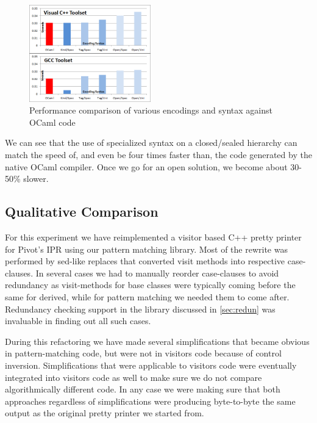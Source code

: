 \begin{figure}[htbp]
  \centering
    \includegraphics[width=0.47\textwidth]{OCamlComparison.png}
  \caption{Performance comparison of various encodings and syntax against OCaml code}
  \label{fig:OCamlComparison}
\end{figure}

We can see that the use of specialized syntax on a closed/sealed hierarchy can 
match the speed of, and even be four times faster than, the code generated by 
the native OCaml compiler. Once we go for an open solution, we become about 
30-50\% slower. 

\subsection{Qualitative Comparison}
\label{sec:qualcmp}

For this experiment we have reimplemented a visitor based C++ pretty printer for 
Pivot's IPR using our pattern matching library. Most of the rewrite was 
performed by sed-like replaces that converted visit methods into respective 
case-clauses. In several cases we had to manually reorder case-clauses to avoid 
redundancy as visit-methods for base classes were typically coming before the 
same for derived, while for pattern matching we needed them to come after. 
Redundancy checking support in the library discussed in \textsection\ref{sec:redun}
was invaluable in finding out all such cases.

During this refactoring we have made several simplifications that became obvious 
in pattern-matching code, but were not in visitors code because of control 
inversion. Simplifications that were applicable to visitors code were eventually 
integrated into visitors code as well to make sure we do not compare 
algorithmically different code. In any case we were making sure that both 
approaches regardless of simplifications were producing byte-to-byte the same 
output as the original pretty printer we started from.

